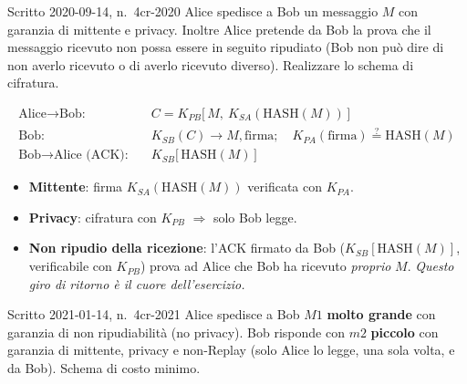 \documentclass{report}
\newcommand{\Ks}[1]{K_{S#1}}   %
\newcommand{\Kp}[1]{K_{P#1}}   %
\newcommand{\HASH}{\text{HASH}}
\begin{document}
\begin{Exercise}{Scritto 2020-09-14, n.\ 4}{cr-2020}
Alice spedisce a Bob un messaggio $M$ con garanzia di mittente e privacy.
Inoltre Alice pretende da Bob la prova che il messaggio ricevuto non possa
essere in seguito ripudiato (Bob non può dire di non averlo ricevuto o di averlo
ricevuto diverso). Realizzare lo schema di cifratura.
\end{Exercise}

\begin{solution}
\begin{align*}
\text{Alice}\to\text{Bob:}\quad & C=\Kp{B}\big[\,M,\ \Ks{A}(\HASH(M))\,\big]\\
\text{Bob:}\quad & \Ks{B}(C)\to M,\text{firma};\quad \Kp{A}(\text{firma})\overset{?}{=}\HASH(M)\\
\text{Bob}\to\text{Alice (ACK):}\quad & \Ks{B}\big[\,\HASH(M)\,\big]
\end{align*}
\begin{itemize}
\item \textbf{Mittente}: firma $\Ks{A}(\HASH(M))$ verificata con $\Kp{A}$.
\item \textbf{Privacy}: cifratura con $\Kp{B}$ $\Rightarrow$ solo Bob legge.
\item \textbf{Non ripudio della ricezione}: l'ACK firmato da Bob
($\Ks{B}[\HASH(M)]$, verificabile con $\Kp{B}$) prova ad Alice che Bob ha
ricevuto \emph{proprio} $M$. \emph{Questo giro di ritorno è il cuore
dell'esercizio.}
\end{itemize}
\end{solution}

\begin{Exercise}{Scritto 2021-01-14, n.\ 4}{cr-2021}
Alice spedisce a Bob $M1$ \textbf{molto grande} con garanzia di non
ripudiabilità (no privacy). Bob risponde con $m2$ \textbf{piccolo} con garanzia
di mittente, privacy e non-Replay (solo Alice lo legge, una sola volta, e da
Bob). Schema di costo minimo.
\end{Exercise}
\end{document}
